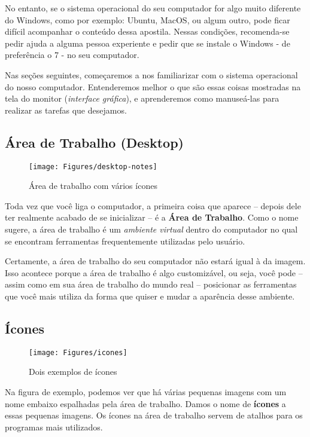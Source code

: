 \documentclass[hidelinks,12pt]{article}
\begin{document}
No entanto, se o sistema operacional do seu computador for algo muito diferente do Windows, como por exemplo: Ubuntu, MacOS, ou algum outro, pode ficar difícil acompanhar o conteúdo dessa apostila. Nessas condições, recomenda-se pedir ajuda a alguma pessoa experiente e pedir que se instale o Windows - de preferência o 7 - no seu computador.

Nas seções seguintes, começaremos a nos familiarizar com o sistema operacional do nosso computador. Entenderemos melhor o que são essas coisas mostradas na tela do monitor (\textit{interface gráfica}), e aprenderemos como manuseá-las para realizar as tarefas que desejamos.

\subsection{Área de Trabalho (Desktop)}

\begin{figure}[!h]
	\centering
	\texttt{[image: Figures/desktop-notes]}
	\caption{Área de trabalho com vários ícones}
	\label{fig:desktop-notes}
\end{figure}

Toda vez que você liga o computador, a primeira coisa que aparece – depois dele ter realmente acabado de se inicializar – é a \textbf{Área de Trabalho}. Como o nome sugere, a área de trabalho é um \textit{ambiente virtual} dentro do computador no qual se encontram ferramentas frequentemente utilizadas pelo usuário. 

Certamente, a área de trabalho do seu computador não estará igual à da imagem. Isso acontece porque a área de trabalho é algo customizável, ou seja, você pode – assim como em sua área de trabalho do mundo real – posicionar as ferramentas que você mais utiliza da forma que quiser e mudar a aparência desse ambiente.

\subsection{Ícones}

    \begin{figure}[!h]
    	\centering
    	\texttt{[image: Figures/icones]}
    	\caption{Dois exemplos de ícones}
    	\label{fig:icones}
    \end{figure}

    Na figura de exemplo, podemos ver que há várias pequenas imagens com um nome embaixo espalhadas pela área de trabalho. Damos o nome de \textbf{ícones} a essas pequenas imagens. Os ícones na área de trabalho servem de atalhos para os programas mais utilizados.
    
\end{document}
